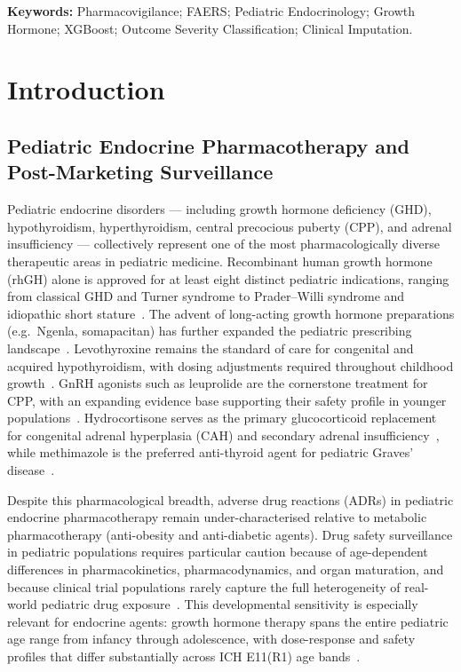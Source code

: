 \documentclass[10pt,twocolumn]{article}
\begin{document}
\begin{tcolorbox}[absbox, title={Structured Abstract}, colbacktitle=jpbiBlue!8, coltitle=jpbiBlue, fonttitle=\small\bfseries\centering\MakeUppercase, toptitle=2pt, bottomtitle=2pt, top=1.5pt, bottom=1.5pt]
\par\vspace{1.5pt}\noindent\textbf{Keywords:}
Pharmacovigilance; FAERS; Pediatric Endocrinology; Growth Hormone; XGBoost; Outcome Severity Classification; Clinical Imputation.
\end{tcolorbox}
\twocolumn
 
\section{Introduction}
 
\subsection{Pediatric Endocrine Pharmacotherapy and Post-Marketing Surveillance}
 
Pediatric endocrine disorders --- including growth hormone deficiency (GHD), hypothyroidism, hyperthyroidism, central precocious puberty (CPP), and adrenal insufficiency --- collectively represent one of the most pharmacologically diverse therapeutic areas in pediatric medicine. Recombinant human growth hormone (rhGH) alone is approved for at least eight distinct pediatric indications, ranging from classical GHD and Turner syndrome to Prader--Willi syndrome and idiopathic short stature~\cite{grimberg2016}. The advent of long-acting growth hormone preparations (e.g.\ Ngenla, somapacitan) has further expanded the pediatric prescribing landscape~\cite{saenger2023}. Levothyroxine remains the standard of care for congenital and acquired hypothyroidism, with dosing adjustments required throughout childhood growth~\cite{biondi2019}. GnRH agonists such as leuprolide are the cornerstone treatment for CPP, with an expanding evidence base supporting their safety profile in younger populations~\cite{carel2009}. Hydrocortisone serves as the primary glucocorticoid replacement for congenital adrenal hyperplasia (CAH) and secondary adrenal insufficiency~\cite{bornstein2016}, while methimazole is the preferred anti-thyroid agent for pediatric Graves' disease~\cite{rivkees2014}.
 
Despite this pharmacological breadth, adverse drug reactions (ADRs) in pediatric endocrine pharmacotherapy remain under-characterised relative to metabolic pharmacotherapy (anti-obesity and anti-diabetic agents). Drug safety surveillance in pediatric populations requires particular caution because of age-dependent differences in pharmacokinetics, pharmacodynamics, and organ maturation, and because clinical trial populations rarely capture the full heterogeneity of real-world pediatric drug exposure~\cite{kearns2003}. This developmental sensitivity is especially relevant for endocrine agents: growth hormone therapy spans the entire pediatric age range from infancy through adolescence, with dose-response and safety profiles that differ substantially across ICH E11(R1) age bands~\cite{ich2017}.
 
\end{document}
